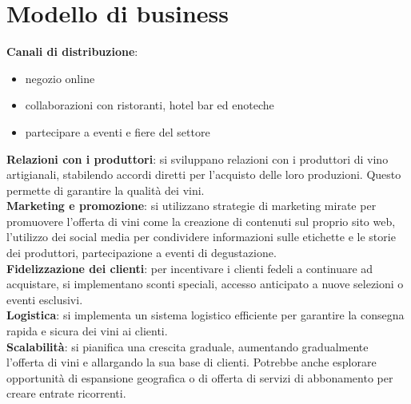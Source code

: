 \documentclass[12pt, a4paper]{article}
\newcommand{\meskip}{\medskip \\}
\begin{document}
\section*{Modello di business}


\textbf{Canali di distribuzione}:
\begin{itemize}[itemsep=-5pt, topsep=0pt]
    \item negozio online
    \item collaborazioni con ristoranti, hotel bar ed enoteche
    \item partecipare a eventi e fiere del settore
\end{itemize}\medskip
\textbf{Relazioni con i produttori}: si sviluppano relazioni con i produttori di vino artigianali, stabilendo accordi diretti per l'acquisto delle loro produzioni. Questo permette di garantire la qualità dei vini.\meskip
\textbf{Marketing e promozione}: si utilizzano strategie di marketing mirate per promuovere l'offerta di vini come la creazione di contenuti sul proprio sito web, l'utilizzo dei social media per condividere informazioni sulle etichette e le storie dei produttori, partecipazione a eventi di degustazione.\meskip
\textbf{Fidelizzazione dei clienti}: per incentivare i clienti fedeli a continuare ad acquistare, si implementano sconti speciali, accesso anticipato a nuove selezioni o eventi esclusivi.\meskip
\textbf{Logistica}: si implementa un sistema logistico efficiente per garantire la consegna rapida e sicura dei vini ai clienti.\meskip
\textbf{Scalabilità}: si pianifica una crescita graduale, aumentando gradualmente l'offerta di vini e allargando la sua base di clienti. Potrebbe anche esplorare opportunità di espansione geografica o di offerta di servizi di abbonamento per creare entrate ricorrenti.
\end{document}
